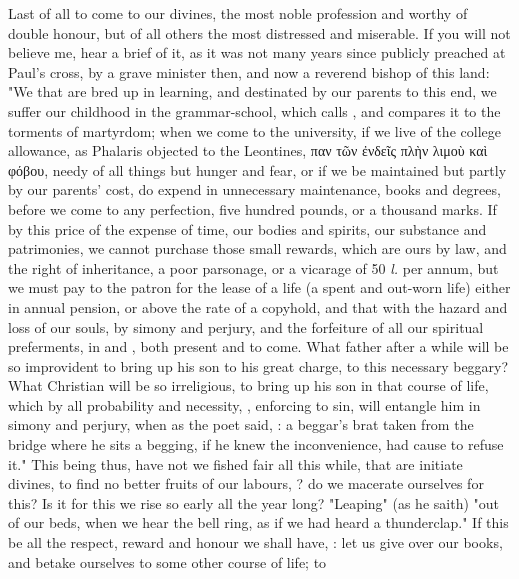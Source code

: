 Last of all to come to our divines, the most noble profession and worthy of
double honour, but of all others the most distressed and miserable. If you will
not believe me, hear a brief of it, as it was not many years since publicly
preached at Paul's cross, by a grave minister then, and
now a reverend bishop of this land: "We that are bred up in learning, and
destinated by our parents to this end, we suffer our childhood in the
grammar-school, which \Austin{} calls , and
compares it to the torments of martyrdom; when we come to the university, if we
live of the college allowance, as Phalaris objected to the Leontines,
\textgreek{παν τῶν ἐνδεῖς πλὴν λιμοὺ καὶ φόβου}, needy of all things but hunger
and fear, or if we be maintained but partly by our parents' cost, do expend in
unnecessary maintenance, books and degrees, before we come to any perfection,
five hundred pounds, or a thousand marks. If by this price of the expense of
time, our bodies and spirits, our substance and patrimonies, we cannot purchase
those small rewards, which are ours by law, and the right of inheritance, a
poor parsonage, or a vicarage of 50 \emph{l.} per annum, but we must pay to the
patron for the lease of a life (a spent and out-worn life) either in annual
pension, or above the rate of a copyhold, and that with the hazard and loss of
our souls, by simony and perjury, and the forfeiture of all our spiritual
preferments, in  and , both present and to come. What father
after a while will be so improvident to bring up his son to his great charge,
to this necessary beggary? What Christian will be so irreligious, to bring up
his son in that course of life, which by all probability and necessity,
, enforcing to sin, will entangle him in simony and
perjury, when as the poet said, : a beggar's brat taken from the bridge where he sits a begging, if he
knew the inconvenience, had cause to refuse it." This being thus, have not we
fished fair all this while, that are initiate divines, to find no better fruits
of our labours, ? do we macerate ourselves for this? Is it for this we rise so
early all the year long? "Leaping" (as he saith) "out of
our beds, when we hear the bell ring, as if we had heard a thunderclap." If
this be all the respect, reward and honour we shall have,
: let
us give over our books, and betake ourselves to some other course of life; to
